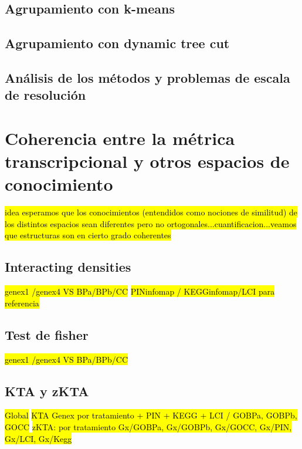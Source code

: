 \subsection{Agrupamiento con k-means}

\subsection{Agrupamiento con dynamic tree cut}

\subsection{Análisis de los métodos y problemas de escala de resolución}

\section{Coherencia entre la métrica transcripcional y otros espacios de conocimiento}
\hl{idea esperamos que los conocimientos (entendidos como nociones de similitud) de los distintos espacios sean diferentes pero no ortogonales...cuantificacion...veamos que estructuras son en cierto grado coherentes}
\subsection{Interacting densities}
\hl{genex1 /genex4  VS BPa/BPb/CC}
\hl{PINinfomap / KEGGinfomap/LCI para referencia}
\subsection{Test de fisher}
\hl{genex1 /genex4  VS BPa/BPb/CC}
\subsection{KTA y zKTA}
\hl{Global}
\hl{KTA Genex por tratamiento + PIN + KEGG + LCI / GOBPa, GOBPb, GOCC}
\hl{zKTA: por tratamiento Gx/GOBPa, Gx/GOBPb, Gx/GOCC, Gx/PIN, Gx/LCI, Gx/Kegg}